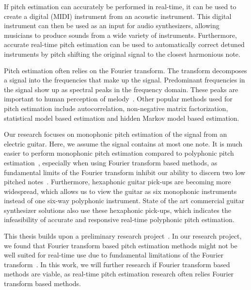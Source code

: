 \documentclass[a4paper,10pt,twocolumn]{article}
\begin{document}
If pitch estimation can accurately be performed in real-time, it can be used to create a digital (MIDI) instrument from an acoustic instrument. This digital instrument can then be used as an input for audio synthesizers, allowing musicians to produce sounds from a wide variety of instruments. Furthermore, accurate real-time pitch estimation can be used to automatically correct detuned instruments by pitch shifting the original signal to the closest harmonious note.

Pitch estimation often relies on the Fourier transform. The transform decomposes a signal into the frequencies that make up the signal. Predominant frequencies in the signal show up as spectral peaks in the frequency domain. These peaks are important to human perception of melody~\cite{hearing}. %
Other popular methods used for pitch estimation include autocorrelation, non-negative matrix factorization, statistical model based estimation and hidden Markov model based estimation.

Our research focuses on monophonic pitch estimation of the signal from an electric guitar. Here, we assume the signal contains at most one note. It is much easier to perform monophonic pitch estimation compared to polyphonic pitch estimation~\cite{monotopoly}, especially when using Fourier transform based methods, as fundamental limits of the Fourier transform inhibit our ability to discern two low pitched notes~\cite{nopoly}. Furthermore, hexaphonic guitar pick-ups are becoming more widespread, which allows us to view the guitar as six monophonic instruments instead of one six-way polyphonic instrument. State of the art commercial guitar synthesizer solutions also use these hexaphonic pick-ups, which indicates the infeasibility of accurate and responsive real-time polyphonic pitch estimation.

This thesis builds upon a preliminary research project~\cite{ik}. In our research project, we found that Fourier transform based pitch estimation methods might not be well suited for real-time use due to fundamental limitations of the Fourier transform~\cite{fourierlimit}. In this work, we will further research if Fourier transform based methods are viable, as real-time pitch estimation research often relies Fourier transform based methods.
\end{document}
